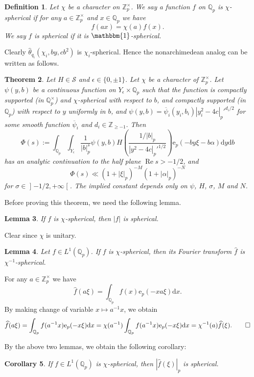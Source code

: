 \documentclass[10pt,oneside,reqno]{amsart}
\makeatletter
\newcommand\lopen{\mathopen{]}}
\newcommand\ropen{\mathclose{[}}
\newcommand\rmd{\mathrm{d}}
\newcommand\rme{\mathrm{e}}
\newcommand\cS{\mathcal{S}}
\newcommand\QQ{\mathbb{Q}}
\newcommand\ZZ{\mathbb{Z}}
\newcommand\triv{\mathbbm{1}}
\renewcommand\Re{\mathop{\mathrm{Re}}}
\renewcommand\geq{\geqslant}
\newcommand\legendresymbol[2]{\genfrac{(}{)}{}{}{#1}{#2}}
\theoremstyle{THEOREM}
\newtheorem{theorem}{Theorem}[section]
\newtheorem{lemma}[theorem]{Lemma}
\newtheorem{corollary}[theorem]{Corollary}
\theoremstyle{DEFINITION}
\newtheorem{definition}[theorem]{Definition}
\theoremstyle{EXERCISE}
\numberwithin{equation}{section}
\renewenvironment{proof}[1][\proofname]{\par
  \vspace{-6pt}
  \pushQED{\qed}
  \normalfont \topsep6\p@\@plus6\p@\relax
  \trivlist
  \item[\hskip\labelsep\rmfamily\bfseries
    #1\@addpunct{:}]\ignorespaces
}{
  \popQED\endtrivlist\@endpefalse
  \vspace{-6pt}
}
\makeatother
\begin{document}
\begin{definition}
Let $\chi$ be a character on $\ZZ_p^\times$. We say a function $f$ on $\QQ_p$ is \emph{$\chi$-spherical} if for any $a\in \ZZ_p^\times$ and $x\in \QQ_p$ we have
\[
f(ax)=\chi(a)f(x).
\]
We say $f$ is \emph{spherical} if it is $\triv$-spherical.
\end{definition}
Clearly $\widehat{\theta}_{q_i}(\chi_i,by,cb^2)$ is $\chi_i$-spherical. Hence the nonarchimedean analog can be written as follows.
\begin{theorem}\label{thm:nonarchimedeanintegralestimate}
Let $H\in \cS$ and $\epsilon\in \{0,\pm 1\}$. Let $\chi$ be a character of $\ZZ_p^\times$. Let $\psi(y,b)$ be a continuous function on $Y_\epsilon\times \QQ_p$ such that the function is compactly supported (in $\QQ_p^\times$) and $\chi$-spherical with respect to $b$, and compactly supported (in $\QQ_p$) with respect to $y$ uniformly in $b$, and $\psi(y,b) =\overline{\psi}_i(y_i,b_i)|y_i^2-4c|_p'^{d_i/2}$ for some smooth function $\overline{\psi}_i$ and $d_i\in \ZZ_{\geq -1}$.
Then
\[
\Phi(s):=\int_{\QQ_p}\int_{Y_\epsilon}\frac{1}{|b|_p^{s}}\psi(y,b)H\legendresymbol {1/|b|_p}{|y^2-4c|_p'^{1/2}}\rme_p(-by\xi-b\alpha)\rmd y\rmd b 
\]
has an analytic continuation to the half plane $\Re s>-1/2$, and 
\[
\Phi(s)\ll(1+|\xi|_p)^{-M}(1+|\alpha|_p)^{-N}
\] 
for $\sigma\in \lopen -1/2,+\infty\ropen$. The implied constant depends only on $\psi$, $H$, $\sigma$, $M$ and $N$. 
\end{theorem}
Before proving this theorem, we need the following lemma.
\begin{lemma}
If $f$ is $\chi$-spherical, then $|f|$ is spherical.
\end{lemma}
\begin{proof}
Clear since $\chi$ is unitary.
\end{proof}
\begin{lemma}
Let $f\in L^1(\QQ_p)$. If $f$ is $\chi$-spherical, then its Fourier transform $\widehat{f}$ is $\chi^{-1}$-spherical.
\end{lemma}
\begin{proof}
For any $a\in \ZZ_p^\times$ we have
\[
\widehat{f}(a\xi)=\int_{\QQ_p}f(x)\rme_p(-xa\xi)\rmd x.
\]
By making change of variable $x\mapsto a^{-1}x$, we obtain
\[
\widehat{f}(a\xi)=\int_{\QQ_p}f(a^{-1}x)\rme_p(-x\xi)\rmd x=\chi(a^{-1}) \int_{\QQ_p}f(a^{-1}x)\rme_p(-x\xi)\rmd x=\chi^{-1}(a)\widehat{f}(\xi).\qedhere
\]
\end{proof}
By the above two lemmas, we obtain the following corollary:
\begin{corollary}\label{cor:absolutespherical}
If $f\in L^1(\QQ_p)$ is $\chi$-spherical, then $|\widehat{f}(\xi)|_p$ is spherical.
\end{corollary}
\end{document}

